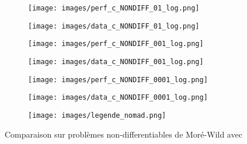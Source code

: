 	\begin{figure}[!htb] %
		\centering
		\begin{subfigure}{0.43\textwidth}
			\texttt{[image: images/perf\_c\_NONDIFF\_01\_log.png]}
		\end{subfigure}%
		\begin{subfigure}{0.43\textwidth}
			\texttt{[image: images/data\_c\_NONDIFF\_01\_log.png]}
		\end{subfigure}
		\smallskip
		\begin{subfigure}{0.43\textwidth}
			\texttt{[image: images/perf\_c\_NONDIFF\_001\_log.png]}
		\end{subfigure}%
		\begin{subfigure}{0.43\textwidth}
			\texttt{[image: images/data\_c\_NONDIFF\_001\_log.png]}
		\end{subfigure}
		\smallskip
		\begin{subfigure}{0.43\textwidth}
			\texttt{[image: images/perf\_c\_NONDIFF\_0001\_log.png]}
		\end{subfigure}%
		\begin{subfigure}{0.43\textwidth}
			\texttt{[image: images/data\_c\_NONDIFF\_0001\_log.png]}
		\end{subfigure}
		\smallskip
		\begin{subfigure}{0.95\textwidth}
			\texttt{[image: images/legende\_nomad.png]}
		\end{subfigure}
		\caption{Comparaison sur problèmes non-differentiables de Moré-Wild avec \CS} \label{fig:1}
	\end{figure}
	\clearpage
